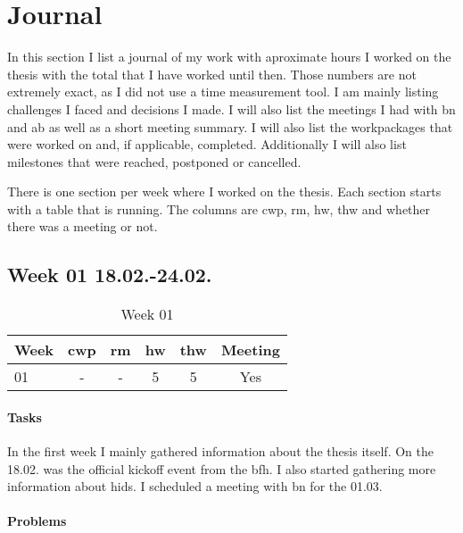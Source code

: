 \chapter{Journal}
\label{sec:journal}

In this section I list a journal of my work with aproximate hours I worked on the thesis with the total that I have worked until then. Those numbers are not extremely exact, as I did not use a time measurement tool. I am mainly listing challenges I faced and decisions I made. I will also list the meetings I had with \gls{bn} and \gls{ab} as well as a short meeting summary. I will also list the workpackages that were worked on and, if applicable, completed. Additionally I will also list milestones that were reached, postponed or cancelled.

There is one section per week where I worked on the thesis. Each section starts with a table that is running. The columns are \gls{cwp}, \gls{rm}, \gls{hw}, \gls{thw} and whether there was a meeting or not.


\section{Week 01 18.02.-24.02.}
\label{sec:journal:week01}

\begin{table}[!ht]
    \begin{center}
        \caption{Week 01}
        \label{tab:journal:week01}
        \begin{tabular}{l|c|c|c|c|c}
            \textbf{Week} & \textbf{\gls{cwp}} & \textbf{\gls{rm}} & \textbf{\gls{hw}} & \textbf{\gls{thw}} & \textbf{Meeting}\\
        \hline
            01  & - & - & 5 & 5 & Yes \\
        \end{tabular}
    \end{center}
\end{table}

\subsubsection{Tasks}

In the first week I mainly gathered information about the thesis itself. On the 18.02. was the official kickoff event from the \gls{bfh}. I also started gathering more information about \gls{hids}. I scheduled a meeting with \gls{bn} for the 01.03.

\subsubsection{Problems}

